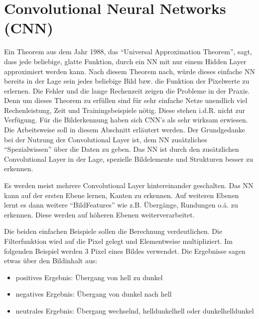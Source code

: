\documentclass[letterpaper,10pt,english]{jupyterBook}
\begin{document}
\chapter{Convolutional Neural Networks (CNN)}
\label{\detokenize{03_CNN/CNN:convolutional-neural-networks-cnn}}\label{\detokenize{03_CNN/CNN::doc}}
\sphinxAtStartPar
Ein Theorem aus dem Jahr 1988, das “Universal Approximation Theorem”, sagt, dass jede beliebige, glatte Funktion, durch ein NN mit nur einem Hidden Layer approximiert werden kann. Nach diesem Theorem nach, würde dieses einfache NN bereits in der Lage sein jedes beliebige Bild bzw. die Funktion der Pixelwerte zu erlernen. Die Fehler und die lange Rechenzeit zeigen die Probleme in der Praxis. Denn um dieses Theorem zu erfüllen sind für sehr einfache Netze unendlich viel Rechenleistung, Zeit und Trainingsbeispiele nötig. Diese stehen i.d.R. nicht zur Verfügung. Für die Bilderkennung haben sich CNN’s als sehr wirksam erwiesen. Die Arbeitsweise soll in diesem Abschnitt erläutert werden.
Der Grundgedanke bei der Nutzung der Convolutional Layer ist, dem NN zusätzliches “Spezialwissen” über die Daten zu geben. Das NN ist durch den zusätzlichen Convolutional Layer in der Lage, spezielle Bildelemente und Strukturen besser zu erkennen.

\sphinxAtStartPar
Es werden meist mehrere Convolutional Layer hintereinander geschalten. Das NN kann auf der ersten Ebene lernen, Kanten zu erkennen. Auf weiteren Ebenen lernt es dann weitere “Bild\sphinxhyphen{}Features” wie z.B. Übergänge, Rundungen o.ä. zu erkennen. Diese werden auf höheren Ebenen weiterverarbeitet.

\sphinxAtStartPar
{}

\sphinxAtStartPar
Die beiden einfachen Beispiele sollen die Berechnung verdeutlichen. Die Filterfunktion wird auf die Pixel gelegt und Elementweise multipliziert.
Im folgenden Beispiel werden 3 Pixel eines Bildes verwendet. Die Ergebnisse sagen etwas über den Bildinhalt aus:
\begin{itemize}
\item {} 
\sphinxAtStartPar
positives Ergebnis: Übergang von hell zu dunkel

\item {} 
\sphinxAtStartPar
negatives Ergebnis: Übergang von dunkel nach hell

\item {} 
\sphinxAtStartPar
neutrales Ergebnis: Übergang wechselnd, hell\sphinxhyphen{}dunkel\sphinxhyphen{}hell  oder dunkel\sphinxhyphen{}hell\sphinxhyphen{}dunkel

\end{itemize}
\end{document}
